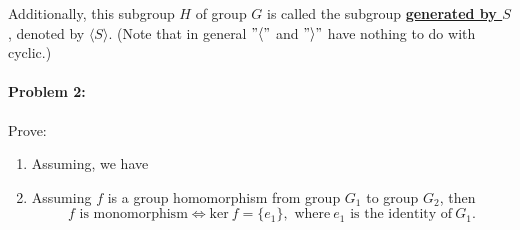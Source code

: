 \documentclass[12pt]{scrartcl}
\begin{document}
{{\begin{enumerate}[label=(\alph*)]
\begin{spacing}{1.3}
	\vspace{0.4em}
Additionally, this subgroup $H$ of group $G$ is called the subgroup \underline{\textbf{generated by $S$}}, denoted by $\langle S \rangle.$ (Note that in general $"\langle"$ and $"\rangle"$ have nothing to do with cyclic.)
\end{spacing}
	\vspace{2em}

	\end{enumerate}

\newpage

\paragraph*{Problem 2: }Prove:

\begin{enumerate}[label=(\alph*)]
	\item Assuming, we have 

\vspace{0.5em}
	\begin{spacing}{1.2}\end{spacing}



	\item Assuming $f$ is a group homomorphism from group $G_1$ to group $G_2$, then $$f \text{~is monomorphism} \iff \text{ker} ~ f = \{e_1\}, \text{~where} ~ e_1 \text{~is the identity of} ~ G_1.$$
	\begin{spacing}{1.5}
\end{spacing}
\end{enumerate}}}
\end{document}
